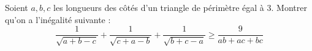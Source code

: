 Soient $a, b, c$ les longueurs des côtés d'un triangle de périmètre égal à $3$. Montrer qu'on a l'inégalité suivante :
$$\frac 1{\sqrt{a + b - c}} + \frac 1{\sqrt{c + a - b}} + \frac 1{\sqrt{b + c - a}}\ge \frac 9{ab+ac+bc}$$